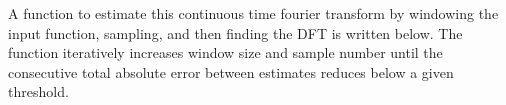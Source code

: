 \documentclass[11pt]{article}
\begin{document}
	

	

	
		
    A function to estimate this continuous time fourier transform by
windowing the input function, sampling, and then finding the DFT is
written below. The function iteratively increases window size and sample
number until the consecutive total absolute error between estimates
reduces below a given threshold.

	

	
		
	
	
		
	
		
			
		
	
		
			
		
	
		
			
		
	
		
			
		
	
		
			
		
	
		
			
		
	
		
			
		
	
		
			
		
	
		
			
		
	
		
			
		
	
		
			
		
	
		
			
		
	
		
			
		
	
		
			
		
	
		
			
		
	
		
			
		
	
		
			
		
	
		
			
		
	
		
			
		
	
		
			
		
	
		
			
		
	
		
			
\end{document}

